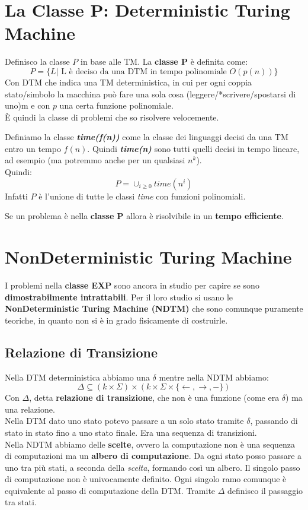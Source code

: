 \section{La Classe P: Deterministic Turing Machine}
\begin{definizione}
  Definisco la classe $P$ in base alle TM. La \textbf{classe P} è definita come:
  \[P=\{L|\mbox{ L è deciso da una DTM in tempo polinomiale } O(p(n))\}\]
  Con DTM che indica una TM deterministica, in cui per ogni coppia stato/simbolo
  la macchina può fare una sola cosa (leggere/*scrivere/spostarsi di uno)m e con
  $p$ una certa funzione polinomiale.\\
  È quindi la classe di problemi che so risolvere velocemente.
\end{definizione}
\begin{definizione}
  Definiamo la classe \textbf{\textit{time(f(n))}} come la classe dei linguaggi
  decisi da una TM entro un tempo $f(n)$. Quindi \textbf{\textit{time(n)}} sono
  tutti quelli decisi in tempo lineare, ad esempio (ma  potremmo anche per un
  qualsiasi $n^k$).\\
  Quindi:
  \[P=\cup_{i\geq 0} time(n^i)\]
  Infatti $P$ è l'unione di tutte le classi \textit{time} con funzioni
  polinomiali. 
\end{definizione}
\begin{definizione}
  Se un problema è nella \textbf{classe P} allora è risolvibile in un
  \textbf{tempo efficiente}.
\end{definizione}
\section{NonDeterministic Turing Machine}
I problemi nella \textbf{classe EXP} sono ancora in studio per capire se sono
\textbf{dimostrabilmente intrattabili}. Per il loro studio
si usano le \textbf{NonDeterministic Turing Machine (NDTM)} che sono comunque
puramente teoriche, in quanto non si è in grado fisicamente di costruirle. 
\subsection{Relazione di Transizione}
Nella DTM deterministica abbiamo una $\delta$ mentre nella NDTM abbiamo:
\[\Delta\subseteq (k\times \Sigma)\times (k\times \Sigma \times\{\leftarrow,
  \rightarrow, -\})\]
Con $\Delta$, detta \textbf{relazione di transizione}, che non è una funzione
(come era $\delta$) ma una relazione.\\ 
Nella DTM dato uno stato potevo passare a un solo stato tramite $\delta$,
passando di stato in stato fino a uno stato finale. Era una sequenza di
transizioni. \\
Nella NDTM abbiamo delle \textbf{scelte}, ovvero la computazione non è una sequenza
di computazioni ma un \textbf{albero di computazione}. Da ogni stato posso
passare a uno tra più stati, a seconda della \textit{scelta}, formando così un
albero. Il singolo passo di computazione non è univocamente definito. Ogni
singolo ramo comunque è equivalente al passo di computazione della DTM. Tramite
$\Delta$ definisco il passaggio tra stati.\\
